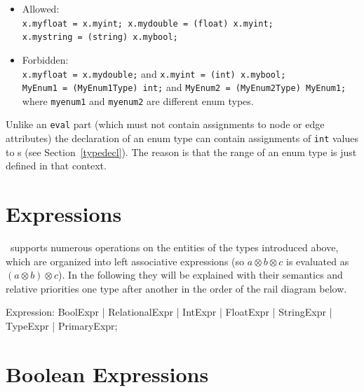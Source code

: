 \begin{example}
  \begin{itemize}
    \item Allowed:\\
	  \texttt{x.myfloat = x.myint; x.mydouble = (float) x.myint;\\ x.mystring = (string) x.mybool;}
    \item Forbidden:\\
      \texttt{x.myfloat = x.mydouble;} and \texttt{x.myint = (int) x.mybool;}\\
      \texttt{MyEnum1 = (MyEnum1Type) int;} and \texttt{MyEnum2 = (MyEnum2Type) MyEnum1;}
  where {\tt myenum1} and {\tt myenum2} are different enum types.

  \end{itemize}
\end{example}

\begin{note}
	Unlike an {\tt eval} part (which must not contain assignments to node or edge attributes) the declaration of an enum type can contain assignments of {\tt int} values to s (see Section~\ref{typedecl}).
	The reason is that the range of an enum type is just defined in that context.
\end{note}


\section{Expressions}\label{sub:expr}

\GrG~supports numerous operations on the entities of the types introduced above, which are organized into left associative expressions (so $a \otimes b \otimes c$ is evaluated as $(a \otimes b) \otimes c$).
In the following they will be explained with their semantics and relative priorities one type after another in the order of the rail diagram below.

\begin{rail}
  Expression: BoolExpr | RelationalExpr | IntExpr | FloatExpr | StringExpr | TypeExpr | PrimaryExpr;
\end{rail}


\section{Boolean Expressions}

